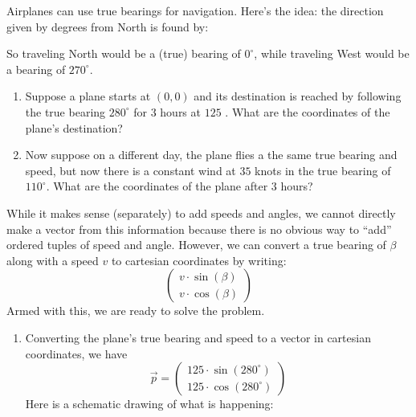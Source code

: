 \documentclass{ximera}
\begin{document}
\begin{example}[Navigation]
  Airplanes can use true bearings for navigation. Here's the idea: the
  direction given by degrees from North is found by:

\begin{center}
\upshape
\def\radius{2cm}
\def\onedegrad{1.8cm}
\def\fivedegrad{1.75cm}
\def\tendegrad{1.7cm}
\def\labelrad{1.6cm}

\end{center}

So traveling North would be a (true) bearing of $0^\circ$, while
traveling West would be a bearing of $270^\circ$. 
\begin{enumerate}
\item Suppose a plane starts at $(0,0)$ and its destination is reached
  by following the true bearing $280^\circ$ for $3$ hours at $125$
  .  What are
  the coordinates of the plane's destination?
\item Now suppose on a different day, the plane flies a the same true
  bearing and speed, but now there is a constant wind at $35$ knots in
  the true bearing of $110^\circ$. What are the coordinates of the
  plane after $3$ hours?
\end{enumerate}

\begin{explanation}
While it makes sense (separately) to add speeds and angles, we cannot
directly make a vector from this information because there is no
obvious way to ``add'' ordered tuples of speed and angle. However, we
can convert a true bearing of $\beta$ along with a speed $v$ to
cartesian coordinates by writing:
\[
\begin{pmatrix}v\cdot \sin(\beta)\\ v \cdot \cos(\beta)\end{pmatrix}
\]
Armed with this, we are ready to solve the problem.
\begin{enumerate}
\item  Converting the plane's true bearing and speed to a vector in cartesian
  coordinates, we have
  \[
  \vec{p} = \begin{pmatrix}125\cdot \sin(280^\circ)\\ 125 \cdot \cos(280^\circ)\end{pmatrix}
  \]
  Here is a schematic drawing of what is happening:


\end{enumerate}
\end{explanation}
\end{example}
\end{document}
